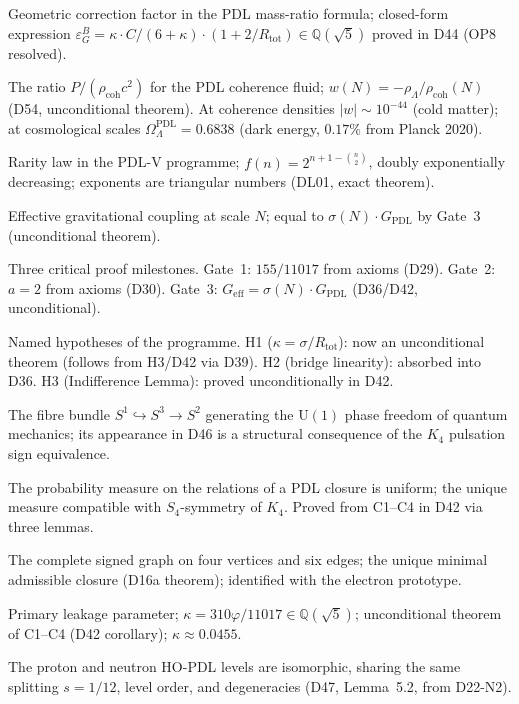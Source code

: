 \documentclass[11pt,a4paper]{article}
\theoremstyle{plain}
\theoremstyle{definition}
\theoremstyle{remark}
\newcommand{\Geff}{G_{\mathrm{eff}}}
\newcommand{\GPDL}{G_{\mathrm{PDL}}}
\newcommand{\Rtot}{R_{\mathrm{tot}}}
\newcommand{\sigmaN}{\sigma(N)}
\newcommand{\epsGeomB}{\varepsilon_G^B}
\newcommand{\rhocoh}{\rho_{\mathrm{coh}}}
\begin{document}
\begin{description}[leftmargin=3.5cm, style=nextline]
\item[$\epsGeomB$] Geometric correction factor in the PDL mass-ratio formula; closed-form expression $\epsGeomB = \kappa \cdot C/(6+\kappa)\cdot(1+2/\Rtot) \in \mathbb{Q}(\sqrt{5})$ proved in D44 (OP8 resolved).
\item[Equation of state $w(N)$] The ratio $P/(\rhocoh c^2)$ for the PDL coherence fluid; $w(N) = -\rho_\Lambda/\rhocoh(N)$ (D54, unconditional theorem). At coherence densities $|w| \sim 10^{-44}$ (cold matter); at cosmological scales $\Omega_\Lambda^{\mathrm{PDL}} = 0.6838$ (dark energy, $0.17\%$ from Planck 2020).
\item[$f(n)$] Rarity law in the PDL-V programme; $f(n) = 2^{n+1-\binom{n}{2}}$, doubly exponentially decreasing; exponents are triangular numbers (DL01, exact theorem).
\item[$\Geff(N)$] Effective gravitational coupling at scale $N$; equal to $\sigmaN\cdot\GPDL$ by Gate~3 (unconditional theorem).
\item[Gate 1, 2, 3] Three critical proof milestones. Gate~1: $155/11017$ from axioms (D29). Gate~2: $a=2$ from axioms (D30). Gate~3: $\Geff=\sigmaN\cdot\GPDL$ (D36/D42, unconditional).
\item[H1, H2, H3] Named hypotheses of the programme. H1 ($\kappa=\sigma/R_{\mathrm{tot}}$): now an unconditional theorem (follows from H3/D42 via D39). H2 (bridge linearity): absorbed into D36. H3 (Indifference Lemma): proved unconditionally in D42.
\item[Hopf fibration] The fibre bundle $S^1\hookrightarrow S^3\to S^2$ generating the $\mathrm{U}(1)$ phase freedom of quantum mechanics; its appearance in D46 is a structural consequence of the $K_4$ pulsation sign equivalence.
\item[Indifference Lemma (H3)] The probability measure on the relations of a PDL closure is uniform; the unique measure compatible with $S_4$-symmetry of $K_4$. Proved from C1--C4 in D42 via three lemmas.
\item[$K_4$] The complete signed graph on four vertices and six edges; the unique minimal admissible closure (D16a theorem); identified with the electron prototype.
\item[$\kappa$] Primary leakage parameter; $\kappa=310\varphi/11017\in\mathbb{Q}(\sqrt{5})$; unconditional theorem of C1--C4 (D42 corollary); $\kappa\approx 0.0455$.
\item[Mirror Lemma] The proton and neutron HO-PDL levels are isomorphic, sharing the same splitting $s=1/12$, level order, and degeneracies (D47, Lemma~5.2, from D22-N2).

\end{description}
\end{document}
